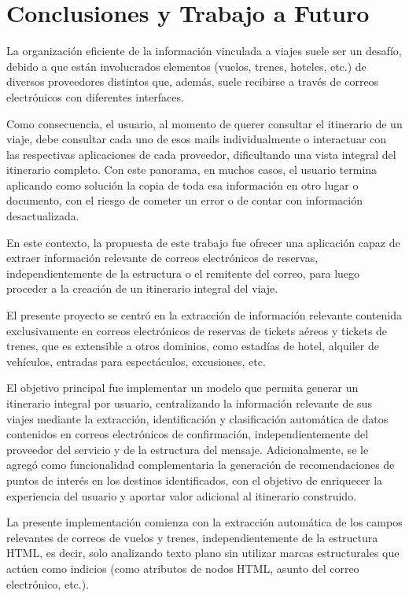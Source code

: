 \section{Conclusiones y Trabajo a Futuro}%
\label{sec:conclusions}

La organización eficiente de la información vinculada a viajes suele ser un desafío, debido a que están
involucrados elementos (vuelos, trenes, hoteles, etc.) de diversos proveedores distintos que, además, suele recibirse a
través de correos electrónicos con diferentes interfaces.

Como consecuencia, el usuario, al momento de querer consultar el itinerario de un viaje, debe consultar cada uno de esos
mails individualmente o interactuar con las respectivas aplicaciones de cada proveedor, dificultando una vista integral
del itinerario completo.
Con este panorama, en muchos casos, el usuario termina aplicando como solución la copia de toda esa información en otro
lugar o documento, con el riesgo de cometer un error o de contar con información desactualizada.

En este contexto, la propuesta de este trabajo fue ofrecer una aplicación capaz de extraer información relevante de
correos electrónicos de reservas, independientemente de la estructura o el remitente del correo, para luego proceder a
la creación de un itinerario integral del viaje.

El presente proyecto se centró en la extracción de información relevante contenida exclusivamente en correos
electrónicos de reservas de tickets aéreos y tickets de trenes, que es extensible a otros dominios, como estadías de
hotel, alquiler de vehículos, entradas para espectáculos, excusiones, etc.

El objetivo principal fue implementar un modelo que permita generar un itinerario integral por usuario, centralizando la
información relevante de sus viajes mediante la extracción, identificación y clasificación automática de datos
contenidos en correos electrónicos de confirmación,
independientemente del proveedor del servicio y de la estructura del mensaje.
Adicionalmente, se le agregó como funcionalidad complementaria la generación de recomendaciones de puntos de interés en
los destinos identificados, con el objetivo de enriquecer la experiencia del usuario y aportar valor adicional al
itinerario construido.

La presente implementación comienza con la extracción automática de los campos relevantes de correos de vuelos y trenes,
independientemente de la estructura HTML, es decir, solo analizando texto plano sin utilizar marcas estructurales que
actúen como indicios (como atributos de nodos HTML, asunto del correo electrónico, etc.).

